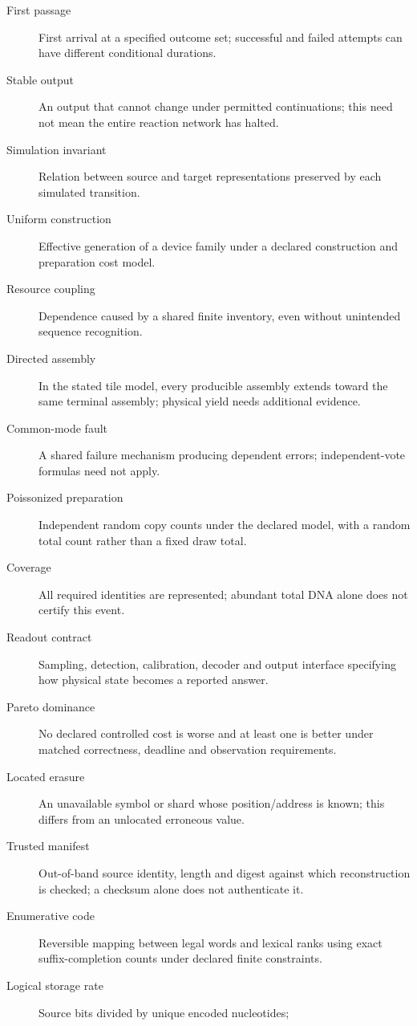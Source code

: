 \begin{description}
\item[First passage] First arrival at a specified outcome set; successful and
failed attempts can have different conditional durations.
\item[Stable output] An output that cannot change under permitted continuations;
this need not mean the entire reaction network has halted.
\item[Simulation invariant] Relation between source and target representations
preserved by each simulated transition.
\item[Uniform construction] Effective generation of a device family under a
declared construction and preparation cost model.
\item[Resource coupling] Dependence caused by a shared finite inventory, even
without unintended sequence recognition.
\item[Directed assembly] In the stated tile model, every producible assembly
extends toward the same terminal assembly; physical yield needs additional evidence.
\item[Common-mode fault] A shared failure mechanism producing dependent errors;
independent-vote formulas need not apply.
\item[Poissonized preparation] Independent random copy counts under the declared
model, with a random total count rather than a fixed draw total.
\item[Coverage] All required identities are represented; abundant total DNA
alone does not certify this event.
\item[Readout contract] Sampling, detection, calibration, decoder and output
interface specifying how physical state becomes a reported answer.
\item[Pareto dominance] No declared controlled cost is worse and at least one
is better under matched correctness, deadline and observation requirements.
\item[Located erasure] An unavailable symbol or shard whose position/address is
known; this differs from an unlocated erroneous value.
\item[Trusted manifest] Out-of-band source identity, length and digest against
which reconstruction is checked; a checksum alone does not authenticate it.
\item[Enumerative code] Reversible mapping between legal words and lexical ranks
using exact suffix-completion counts under declared finite constraints.
\item[Logical storage rate] Source bits divided by unique encoded nucleotides;

\end{description}
